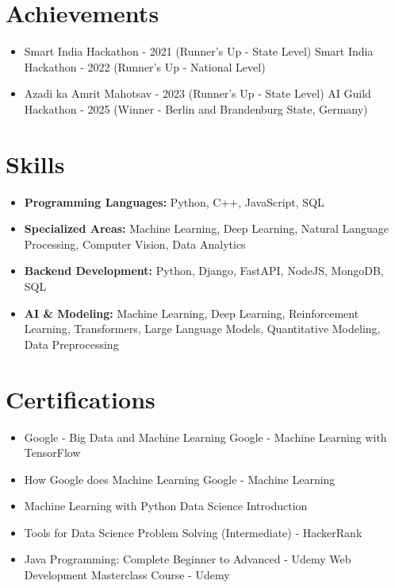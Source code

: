 \documentclass[a4paper,10pt]{article}
\begin{document}
\section*{Achievements}
\begin{itemize}
\item Smart India Hackathon - 2021 (Runner's Up - State Level) \hfill Smart India Hackathon - 2022 (Runner's Up - National Level)
\item Azadi ka Amrit Mahotsav - 2023 (Runner's Up - State Level) \hfill AI Guild Hackathon - 2025 (Winner - Berlin and Brandenburg State, Germany)
\end{itemize}

\section*{Skills}
\begin{itemize}
  \item \textbf{Programming Languages:} Python, C++, JavaScript, SQL
  \item \textbf{Specialized Areas:} Machine Learning, Deep Learning, Natural Language Processing, Computer Vision, Data Analytics
  \item \textbf{Backend Development:} Python, Django, FastAPI, NodeJS, MongoDB, SQL
  \item \textbf{AI \& Modeling:} Machine Learning, Deep Learning, Reinforcement Learning, Transformers, Large Language Models, Quantitative Modeling, Data Preprocessing
\end{itemize}

\section*{Certifications}
\begin{itemize}
\item Google - Big Data and Machine Learning \hfill Google - Machine Learning with TensorFlow
\item How Google does Machine Learning \hfill Google - Machine Learning
\item Machine Learning with Python \hfill Data Science Introduction
\item Tools for Data Science \hfill Problem Solving (Intermediate) - HackerRank
\item Java Programming: Complete Beginner to Advanced - Udemy \hfill Web Development Masterclass Course - Udemy
\end{itemize}
\end{document}
